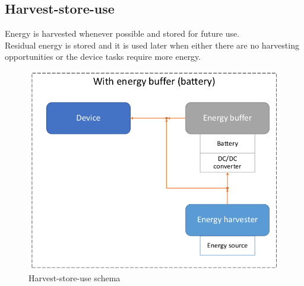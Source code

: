 \subsection{Harvest-store-use}
\begin{paracol}{2}
   \colfill
   Energy is harvested whenever
   possible and stored for future
   use.\\
   Residual energy is stored and it
   is used later when either there
   are no harvesting opportunities
   or the device tasks require more
   energy.
   \colfill
   \switchcolumn
   \begin{figure}[htbp]
      \centering
      \includegraphics{images/harveststoreuse1.png}
      \caption{Harvest-store-use schema}
      \label{fig:harveststoreuse1}
   \end{figure}
\end{paracol}

